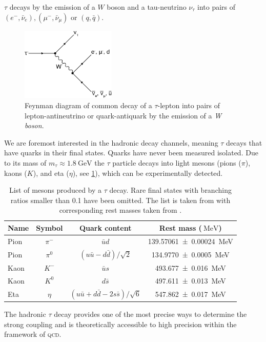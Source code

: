 \documentclass[../../index.tex]{subfiles}
\begin{document}
\(\tau\) decays by the emission of a \(W\) boson and a tau-neutrino \(\nu_\tau\)
into pairs of \((e^-, \bar\nu_e), (\mu^-, \bar\nu_\mu)\) or \((q, \bar q)\).
\begin{figure}
  \centering \includegraphics[width=0.4\textwidth]{images/tauDecay.eps}
  \caption{Feynman diagram of common decay of a \(\tau\)-lepton into pairs of
    lepton-antineutrino or quark-antiquark by the emission of a \textit{W
      boson}.}
  \label{fig:tauDecay}
\end{figure}
We are foremost interested in the hadronic decay channels, meaning \(\tau\)
decays that have quarks in their final states. Quarks have never been measured
isolated. Due to its mass of \(m_\tau \approx \SI{1.8}{\giga\electronvolt}\) the
\(\tau\) particle decays into light mesons (pions (\(\pi\)), kaons (\(K\)), and
eta (\(\eta\)), see \cref{table:lightMesons}), which can be experimentally
detected.
\begin{table}
  \centering
  \begin{tabular}{lccc}
    \toprule
    Name & Symbol & Quark content & Rest mass (\(\SI{}{\mega\electronvolt}\)) \\
    \midrule
    Pion & \(\pi^-\) & \(\bar u d\) & \SI{139.57061 \pm 0.00024}{\mega\electronvolt}  \\
    Pion & \(\pi^0\) & \((u \bar u - d \bar d)/\sqrt{2}\) & \SI{134.9770\pm0.0005}{\mega\electronvolt} \\
    Kaon & \(K^-\) & \(\bar u s\) & \SI{493.677\pm0.016}{\mega\electronvolt} \\
    Kaon & \(K^0\) & \(d \bar s\) & \SI{497.611\pm0.013}{\mega\electronvolt} \\
    Eta & \(\eta\) & \((u \bar u + d \bar d - 2 s \bar s)/\sqrt{6}\) & \SI{547.862\pm0.017}{\mega\electronvolt} \\
  \end{tabular}
  \caption{List of mesons produced by a \(\tau\) decay. Rare final states with
    branching ratios smaller than 0.1 have been omitted. The list is taken from
    \cite{Davier2006} with corresponding rest masses taken from \cite{PDG2018}.}
  \label{table:lightMesons}
\end{table}
The hadronic \(\tau\) decay provides one of the most precise ways to determine
the strong coupling \cite{Pich2016} and is theoretically accessible to high
precision within the framework of \textsc{qcd}.
\end{document}
